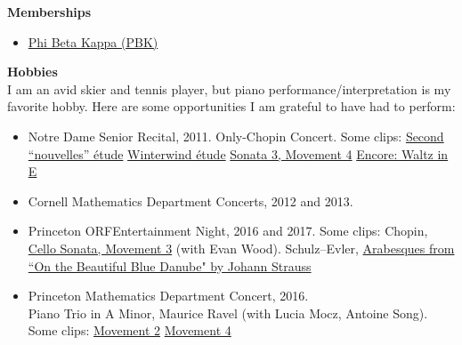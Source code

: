 \documentclass[letterpaper,11pt]{article}
\newcommand{\resheading}[1]{{\large {\textbf{#1 \vphantom{p\^{E}}}}}}
\begin{document}
\resheading{Memberships}
\begin{itemize}
\item \href{http://www.pbk.org/}{Phi Beta Kappa (PBK)}
\end{itemize}


\resheading{Hobbies}
\\
I am an avid skier and tennis player, but piano performance/interpretation is my favorite hobby. Here are some opportunities I am grateful to have had to perform: 
\begin{itemize}


\item Notre Dame Senior Recital, 2011. Only-Chopin Concert. Some clips:
\subitem \href{https://www.facebook.com/mark.cerenzia.90/videos/vb.35108657/10100397230349342/?type=3}{Second ``nouvelles'' \'{e}tude}
\subitem \href{https://www.facebook.com/mark.cerenzia.90/videos/vb.35108657/10100397251901152/?type=3}{Winterwind \'{e}tude}
\subitem \href{https://www.facebook.com/mark.cerenzia.90/videos/vb.35108657/10100397305089562/?type=3}{Sonata 3, Movement 4}
\subitem \href{https://www.facebook.com/mark.cerenzia.90/videos/vb.35108657/10100397330358922/?type=3}{Encore: Waltz in E}

\item Cornell Mathematics Department Concerts, 2012 and 2013.

\item Princeton ORFEntertainment Night, 2016 and 2017. Some clips:
\subitem Chopin, \href{https://www.youtube.com/watch?v=gf-ZHzTomSg&list=PLwpFe8W22NfX4K9OOQKUouIrOc_pwntbs&index=3}{Cello Sonata, Movement 3} (with Evan Wood).
\subitem Schulz--Evler, \href{https://www.youtube.com/watch?v=pOAiON-sooA&index=2&list=PLwpFe8W22NfXC8-t3SJXgK-XChBY9vOAQ}{Arabesques from ``On the Beautiful Blue Danube" by Johann Strauss}
\item Princeton Mathematics Department Concert, 2016. \\ 
Piano Trio in A Minor, Maurice Ravel (with Lucia Mocz, Antoine Song). Some clips:
\subitem \href{https://www.facebook.com/mark.cerenzia.90/videos/vb.35108657/10100854009195872/?type=3}{Movement 2}
\subitem \href{https://www.facebook.com/mark.cerenzia.90/videos/vb.35108657/10100855055808452/?type=3}{Movement 4}
\end{itemize}
\end{document}
